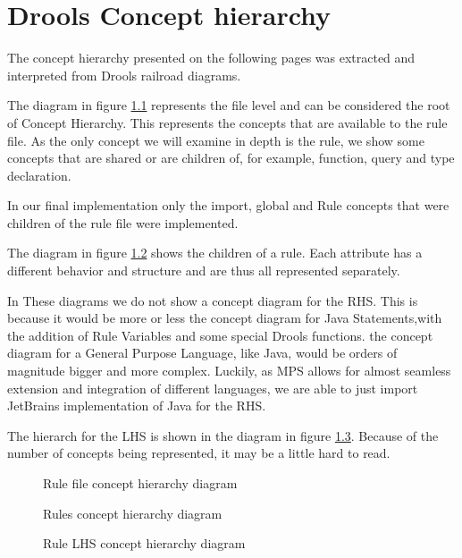 \chapter{Drools Concept hierarchy}
\label{appendix:DroolsConceptHierarchy}

The concept hierarchy presented on the following pages was extracted and interpreted from Drools railroad diagrams.

The diagram in figure \ref{fig:RuleFileDiagram} represents the file level and can be considered the root of Concept Hierarchy.
This represents the concepts that are available to the rule file.
As the only concept we will examine in depth is the rule, we show some concepts that are shared or are children of, for example, function, query and type declaration.

In our final implementation only the import, global and Rule concepts that were children of the rule file were implemented.

The diagram in figure \ref{fig:RuleDiagram} shows the children of a rule.
Each attribute has a different behavior and structure and are thus all represented separately.

In These diagrams we do not show a concept diagram for the RHS.
This is because it would be more or less the concept diagram for Java Statements,with the addition of Rule Variables and some special Drools functions.
the concept diagram for a General Purpose Language, like Java, would be orders of magnitude bigger and more complex.
Luckily, as MPS allows for almost seamless extension and integration of different languages, we are able to just import JetBrains implementation of Java for the RHS.

The hierarch for the LHS is shown in the diagram in figure \ref{fig:LHSDiagram}.
Because of the number of concepts being represented, it may be a little hard to read.

\begin{figure}[h]
    \centering
    \caption{Rule file concept hierarchy diagram}
    \label{fig:RuleFileDiagram}
\end{figure}
 

\begin{figure}[h]
    \centering
    \caption{Rules concept hierarchy diagram}
    \label{fig:RuleDiagram}
\end{figure}
 

\begin{figure}[h]
    \centering
    \caption{Rule LHS concept hierarchy diagram}
    \label{fig:LHSDiagram}
\end{figure}
 